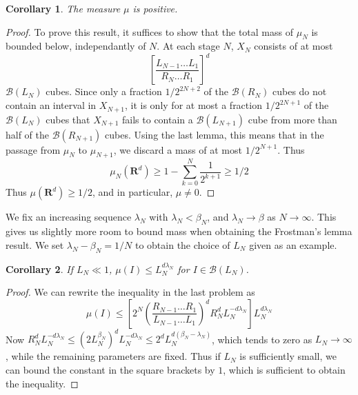 \documentclass{article}
\theoremstyle{plain}
\newtheorem*{corollary}{Corollary}
\theoremstyle{plain}
\begin{document}
\begin{multicols}{2}
\begin{corollary}
	The measure $\mu$ is positive.
\end{corollary}
\begin{proof}
	To prove this result, it suffices to show that the total mass of $\mu_N$ is bounded below, independantly of $N$. At each stage $N$, $X_N$ consists of at most
	\[ \left[ \frac{L_{N-1} \dots L_1}{R_N \dots R_1} \right]^d \]
	$\mathcal{B}(L_N)$ cubes. Since only a fraction $1/2^{2N+2}$ of the $\mathcal{B}(R_N)$ cubes do not contain an interval in $X_{N+1}$, it is only for at most a fraction $1/2^{2N+1}$ of the $\mathcal{B}(L_N)$ cubes that $X_{N+1}$ fails to contain a $\mathcal{B}(L_{N+1})$ cube from more than half of the $\mathcal{B}(R_{N+1})$ cubes. Using the last lemma, this means that in the passage from $\mu_N$ to $\mu_{N+1}$, we discard a mass of at most $1/2^{N+1}$. Thus
	\[ \mu_N(\mathbf{R}^d) \geq 1 - \sum_{k = 0}^N \frac{1}{2^{k+1}} \geq 1/2 \]
	Thus $\mu(\mathbf{R}^d) \geq 1/2$, and in particular, $\mu \neq 0$.
\end{proof}


We fix an increasing sequence $\lambda_N$ with $\lambda_N < \beta_N$, and $\lambda_N \to \beta$ as $N \to \infty$. This gives us slightly more room to bound mass when obtaining the Frostman's lemma result. We set $\lambda_N - \beta_N = 1/N$ to obtain the choice of $L_N$ given as an example.

\begin{corollary}
	If $L_N \ll 1$, $\mu(I) \leq L_N^{d \lambda_N}$ for $I \in \mathcal{B}(L_N)$.
\end{corollary}
\begin{proof}
	We can rewrite the inequality in the last problem as
	\[ \mu(I) \leq \left[ 2^N \left( \frac{R_{N-1} \dots R_1}{L_{N-1} \dots L_1} \right)^d R_N^d L_N^{- d \lambda_N} \right] L_N^{d\lambda_N} \]
	Now $R_N^d L_N^{-d\lambda_N} \leq (2L_N^{\beta_N})^d L_N^{-d\lambda_N} \leq 2^d L_N^{d(\beta_N - \lambda_N)}$, which tends to zero as $L_N \to \infty$, while the remaining parameters are fixed. Thus if $L_N$ is sufficiently small, we can bound the constant in the square brackets by $1$, which is sufficient to obtain the inequality.
\end{proof}


\end{multicols}
\end{document}
